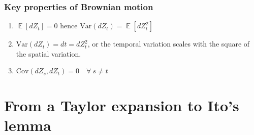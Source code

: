 \documentclass[12pt]{article}
\DeclareMathOperator*{\E}{\mathbb{E}}
\begin{document}
\subsubsection{Key properties of Brownian motion} \label{KeyProperties_BrownianMotion}
\begin{enumerate}
	\item $\E\left[dZ_t\right]=0$ hence $\mathrm{Var}(dZ_t)=\E\left[dZ_t^2\right]$
	\item $\mathrm{Var}(dZ_t)=dt=dZ_t^2$, or the temporal variation scales with the square of the spatial variation. \label{dZVsdt}
	\item $\mathrm{Cov}(dZ_s,dZ_t)=0\quad\forall\: s\not=t$
\end{enumerate}









\section{From a Taylor expansion to Ito's lemma}
\end{document}
